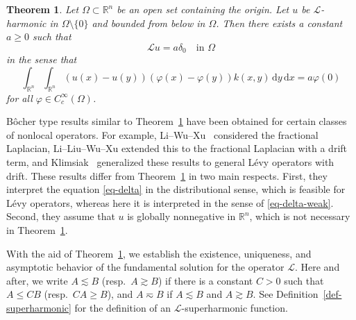 \documentclass[11pt]{amsart}
\theoremstyle{plain}
\newtheorem{theorem}{Theorem}[section]
\theoremstyle{definition}
\numberwithin{equation}{section}
\begin{document}
\begin{theorem}\label{thm-weak-Bocher}
Let $\Omega \subset \mathbb{R}^n$ be an open set containing the origin. Let $u$ be $\mathcal{L}$-harmonic in $\Omega \setminus \{0\}$ and bounded from below in $\Omega$. Then there exists a constant $a \geq 0$ such that
\begin{equation}\label{eq-delta}
	\mathcal{L}u=a\delta_0 \quad\text{in }\Omega
\end{equation}
in the sense that
\begin{equation}\label{eq-delta-weak}
	\int_{\mathbb{R}^n} \int_{\mathbb{R}^n} (u(x)-u(y))(\varphi(x)-\varphi(y)) k(x, y) \,\mathrm{d}y\,\mathrm{d}x=a\varphi(0)
\end{equation}
for all $\varphi \in C_c^{\infty}(\Omega)$.
\end{theorem}

B\^ocher type results similar to Theorem~\ref{thm-weak-Bocher} have been obtained for certain classes of nonlocal operators. For example, Li--Wu--Xu~\cite{LWX18} considered the fractional Laplacian, Li--Liu--Wu--Xu \cite{LLWX20} extended this to the fractional Laplacian with a drift term, and Klimsiak~\cite{Kli25} generalized these results to general L\'evy operators with drift. These results differ from Theorem~\ref{thm-weak-Bocher} in two main respects. First, they interpret the equation \eqref{eq-delta} in the distributional sense, which is feasible for L\'evy operators, whereas here it is interpreted in the sense of \eqref{eq-delta-weak}. Second, they assume that $u$ is globally nonnegative in $\mathbb{R}^n$, which is not necessary in Theorem~\ref{thm-weak-Bocher}.

With the aid of Theorem~\ref{thm-weak-Bocher}, we establish the existence, uniqueness, and asymptotic behavior of the fundamental solution for the operator $\mathcal{L}$. Here and after, we write $A \lesssim B$ (resp.\ $A \gtrsim B$) if there is a constant $C>0$ such that $A \leq CB$ (resp.\ $CA \geq B$), and $A \eqsim B$ if $A \lesssim B$ and $A \gtrsim B$. See Definition~\ref{def-superharmonic} for the definition of an $\mathcal{L}$-superharmonic function.
\end{document}
